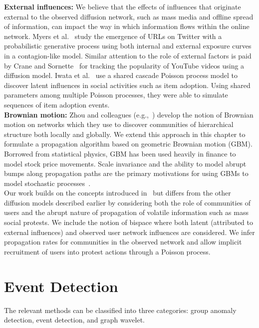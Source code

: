 \noindent
{\bf External influences:}
We believe that the effects of influences that originate external
to the observed diffusion network, such as mass media
and offline spread of information, can impact the way in which information
flows within the online network.
Myers et al.~\cite{myers2012information} study the emergence of URLs
on Twitter with a probabilistic generative process using both
internal and external exposure curves in a contagion-like model.
Similar attention to the role of external factors is
paid by Crane and Sornette~\cite{crane2008robust} for
tracking the popularity of YouTube videos using a diffusion model.
Iwata et al.~\cite{iwata2013discovering} use
a shared cascade Poisson process model to discover
latent influences in social activities such as item adoption.
Using shared parameters among multiple Poisson processes, they were able to simulate sequences of item adoption events. \\


\noindent
{\bf Brownian motion:}
Zhou and colleagues (e.g.,~\cite{zhou2003distance, zhou2003network,
zhou2004network}) develop the notion of Brownian motion on networks
which they
use to discover communities of hierarchical structure both locally
and globally. We extend this approach in this chapter
to formulate a propagation algorithm based on geometric Brownian
motion (GBM). Borrowed from statistical physics, GBM has been
used heavily in finance to model stock price movements.
Scale invariance and the ability to model abrupt bumps
along propagation paths are the primary motivations for using GBMs
to model stochastic processes~\cite{tankov2004financial}. \\

\noindent
Our work builds on the concepts
introduced in~\cite{zhou2003network, iwata2013discovering, zhou2003distance, zhou2004network} but differs from the other diffusion models
described earlier by considering both the role of communities of
users and the abrupt nature of propagation of volatile information such as mass social protests. We include the notion of bispace where both latent (attributed to external influences) and observed user network influences are considered. We infer propagation rates for communities in the observed network and allow
implicit recruitment of users into protest actions through a Poisson process.




\section{Event Detection}
The relevant methods can be classified into three categories: group anomaly detection, event detection, and graph wavelet.

